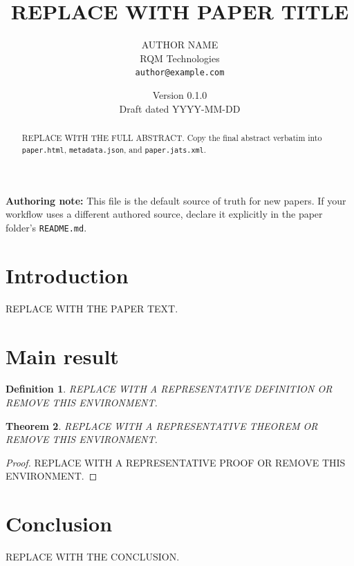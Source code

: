 \documentclass[11pt]{article}
\title{\textbf{REPLACE WITH PAPER TITLE}}
\author{AUTHOR NAME\\RQM Technologies\\\texttt{author@example.com}}
\date{Version 0.1.0 \\ Draft dated YYYY-MM-DD}
\newtheorem{definition}{Definition}[section]
\newtheorem{theorem}[definition]{Theorem}
\theoremstyle{remark}
\begin{document}
\maketitle

\begin{abstract}
REPLACE WITH THE FULL ABSTRACT. Copy the final abstract verbatim into
\texttt{paper.html}, \texttt{metadata.json}, and \texttt{paper.jats.xml}.
\end{abstract}

\noindent\textbf{Authoring note:} This file is the default source of truth for new
papers. If your workflow uses a different authored source, declare it explicitly
in the paper folder's \texttt{README.md}.

\section{Introduction}

REPLACE WITH THE PAPER TEXT.

\section{Main result}

\begin{definition}
REPLACE WITH A REPRESENTATIVE DEFINITION OR REMOVE THIS ENVIRONMENT.
\end{definition}

\begin{theorem}
REPLACE WITH A REPRESENTATIVE THEOREM OR REMOVE THIS ENVIRONMENT.
\end{theorem}

\begin{proof}
REPLACE WITH A REPRESENTATIVE PROOF OR REMOVE THIS ENVIRONMENT.
\end{proof}

\section{Conclusion}

REPLACE WITH THE CONCLUSION.



\end{document}
